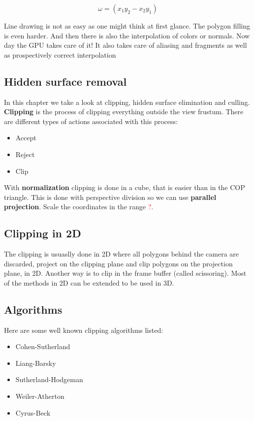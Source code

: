 		\begin{equation}
			\omega = (x_1y_2 - x_2y_1)		
		\end{equation}
		
	Line drawing is not as easy as one might think at first glance. The polygon filling is even harder. And then there is also the interpolation of colors or normals. Now day the GPU takes care of it! It also takes care of aliasing and fragments as well as prospectively correct interpolation 

	\subsection*{Hidden surface removal}
	In this chapter we take a look at clipping, hidden surface elimination and culling. \textbf{Clipping} is the process of clipping everything outside the view frustum. There are different types of actions associated with this process:

		\begin{itemize}
			\item Accept
			\item Reject
			\item Clip
		\end{itemize}

	With \textbf{normalization} clipping is done in a cube, that is easier than in the COP triangle. This is done with perspective division so we can use \textbf{parallel projection}. Scale the coordinates in the range \textcolor{red}{?}. 

	\subsection*{Clipping in 2D}
	The clipping is usuaslly done in 2D where all polygons behind the camera are discarded, project on the clipping plane and clip polygons on the projection plane, in 2D. Another way is to clip in the frame buffer (called scissoring). Most of the methods in 2D can be extended to be used in 3D.

	\subsection*{Algorithms}
	Here are some well known clipping algorithms listed:

		\begin{itemize}
			\item Cohen-Sutherland
			\item Liang-Barsky
			\item Sutherland-Hodgeman
			\item Weiler-Atherton
			\item Cyrus-Beck
		\end{itemize}

